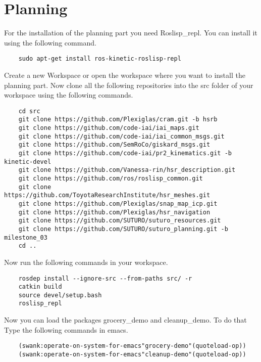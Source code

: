 \documentclass[main.tex]{subfiles}
\begin{document}
	\section{Planning}
	
	For the installation of the planning part you need Roslisp\_repl.
	You can install it using the following command.
	\begin{lstlisting}
	sudo apt-get install ros-kinetic-roslisp-repl \end{lstlisting}

	Create a new Workspace or open the workspace where you want to install the planning part. Now clone all the following repositories into the src folder of your workspace using the following commands.
	\begin{lstlisting}
	cd src
	git clone https://github.com/Plexiglas/cram.git -b hsrb
	git clone https://github.com/code-iai/iai_maps.git
	git clone https://github.com/code-iai/iai_common_msgs.git
	git clone https://github.com/SemRoCo/giskard_msgs.git
	git clone https://github.com/code-iai/pr2_kinematics.git -b kinetic-devel
	git clone https://github.com/Vanessa-rin/hsr_description.git
	git clone https://github.com/ros/roslisp_common.git
	git clone https://github.com/ToyotaResearchInstitute/hsr_meshes.git
	git clone https://github.com/Plexiglas/snap_map_icp.git
	git clone https://github.com/Plexiglas/hsr_navigation
	git clone https://github.com/SUTURO/suturo_resources.git
	git clone https://github.com/SUTURO/suturo_planning.git -b milestone_03
	cd .. \end{lstlisting}
	
	Now run the following commands in your workspace.
	\begin{lstlisting}
	rosdep install --ignore-src --from-paths src/ -r
	catkin build
	source devel/setup.bash
	roslisp_repl \end{lstlisting}
	
	Now you can load the packages grocery\_demo and cleanup\_demo.
	To do that Type the following commands in emacs.
	\begin{lstlisting}
	(swank:operate-on-system-for-emacs"grocery-demo"(quoteload-op))
	(swank:operate-on-system-for-emacs"cleanup-demo"(quoteload-op)) \end{lstlisting}
	
\end{document}
